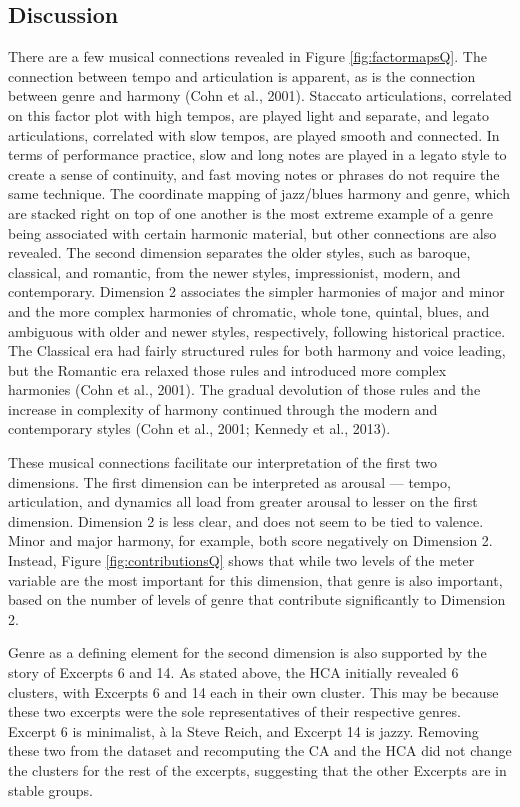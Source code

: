 \documentclass[
  english,
  man,floatsintext]{apa6}
\begin{document}
\hypertarget{discussion}{%
\subsection{Discussion}\label{discussion}}

There are a few musical connections revealed in Figure \ref{fig:factormapsQ}. The connection between tempo and articulation is apparent, as is the connection between genre and harmony (Cohn et al., 2001). Staccato articulations, correlated on this factor plot with high tempos, are played light and separate, and legato articulations, correlated with slow tempos, are played smooth and connected. In terms of performance practice, slow and long notes are played in a legato style to create a sense of continuity, and fast moving notes or phrases do not require the same technique. The coordinate mapping of jazz/blues harmony and genre, which are stacked right on top of one another is the most extreme example of a genre being associated with certain harmonic material, but other connections are also revealed. The second dimension separates the older styles, such as baroque, classical, and romantic, from the newer styles, impressionist, modern, and contemporary. Dimension 2 associates the simpler harmonies of major and minor and the more complex harmonies of chromatic, whole tone, quintal, blues, and ambiguous with older and newer styles, respectively, following historical practice. The Classical era had fairly structured rules for both harmony and voice leading, but the Romantic era relaxed those rules and introduced more complex harmonies (Cohn et al., 2001). The gradual devolution of those rules and the increase in complexity of harmony continued through the modern and contemporary styles (Cohn et al., 2001; Kennedy et al., 2013).

These musical connections facilitate our interpretation of the first two dimensions. The first dimension can be interpreted as arousal --- tempo, articulation, and dynamics all load from greater arousal to lesser on the first dimension. Dimension 2 is less clear, and does not seem to be tied to valence. Minor and major harmony, for example, both score negatively on Dimension 2. Instead, Figure \ref{fig:contributionsQ} shows that while two levels of the meter variable are the most important for this dimension, that genre is also important, based on the number of levels of genre that contribute significantly to Dimension 2.

Genre as a defining element for the second dimension is also supported by the story of Excerpts 6 and 14. As stated above, the HCA initially revealed 6 clusters, with Excerpts 6 and 14 each in their own cluster. This may be because these two excerpts were the sole representatives of their respective genres. Excerpt 6 is minimalist, à la Steve Reich, and Excerpt 14 is jazzy. Removing these two from the dataset and recomputing the CA and the HCA did not change the clusters for the rest of the excerpts, suggesting that the other Excerpts are in stable groups.
\end{document}

